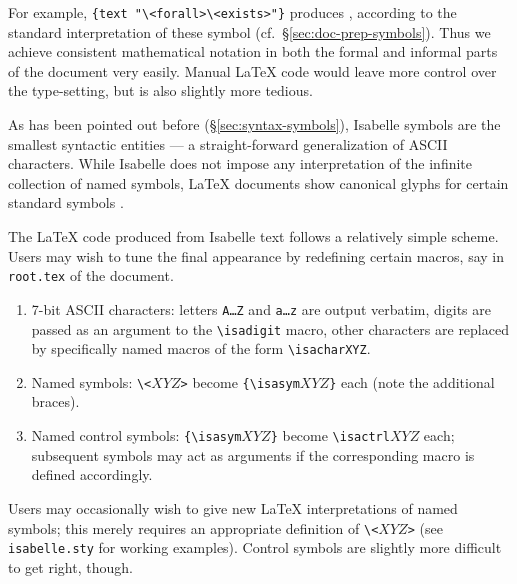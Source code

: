\begin{isabellebody}
\begin{isamarkuptext}
  For example, \texttt{\at}\verb,{text "\<forall>\<exists>"}, produces \isa{{\isasymforall}{\isasymexists}}, according to the standard interpretation of these symbol
  (cf.\ \S\ref{sec:doc-prep-symbols}).  Thus we achieve consistent
  mathematical notation in both the formal and informal parts of the
  document very easily.  Manual {\LaTeX} code would leave more control
  over the type-setting, but is also slightly more tedious.%
\end{isamarkuptext}%
\isamarkuptrue%
%
\isamarkuptrue%
%
\begin{isamarkuptext}%
As has been pointed out before (\S\ref{sec:syntax-symbols}),
  Isabelle symbols are the smallest syntactic entities --- a
  straight-forward generalization of ASCII characters.  While Isabelle
  does not impose any interpretation of the infinite collection of
  named symbols, {\LaTeX} documents show canonical glyphs for certain
  standard symbols \cite[appendix~A]{isabelle-sys}.

  The {\LaTeX} code produced from Isabelle text follows a relatively
  simple scheme.  Users may wish to tune the final appearance by
  redefining certain macros, say in \texttt{root.tex} of the document.

  \begin{enumerate}

  \item 7-bit ASCII characters: letters \texttt{A\dots Z} and
  \texttt{a\dots z} are output verbatim, digits are passed as an
  argument to the \verb,\isadigit, macro, other characters are
  replaced by specifically named macros of the form
  \verb,\isacharXYZ,.

  \item Named symbols: \verb,\,\verb,<,$XYZ$\verb,>, become
  \verb,{\isasym,$XYZ$\verb,}, each (note the additional braces).

  \item Named control symbols: \verb,{\isasym,$XYZ$\verb,}, become
  \verb,\isactrl,$XYZ$ each; subsequent symbols may act as arguments
  if the corresponding macro is defined accordingly.

  \end{enumerate}

  Users may occasionally wish to give new {\LaTeX} interpretations of
  named symbols; this merely requires an appropriate definition of
  \verb,\,\verb,<,$XYZ$\verb,>, (see \texttt{isabelle.sty} for working
  examples).  Control symbols are slightly more difficult to get
  right, though.


\end{isamarkuptext}
\end{isabellebody}
